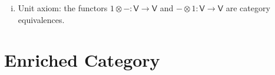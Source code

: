 \documentclass{report}
\begin{document}
{\begin{enumerate}[(i)]
\[\begin{tikzcd}[ampersand replacement=\&, column sep=small]
(A\otimes( B\otimes C))\otimes D \arrow[rd, "{a_{(A,B\otimes C,D)}}"'] \&                                                                                    \&    \&       \& (A\otimes B)\otimes (C\otimes D) \arrow[ld, "{a_{(A, B, C\otimes D)}}"] \\[+35pt]
            \& A\otimes( (B\otimes C)\otimes D) \arrow[rr, "{\mathrm{id}_A\otimes a_{(B,C,D)}}"'] \&    \& A\otimes( B\otimes (C\otimes D)) \&                                                                        
\end{tikzcd}
    \]
    \item Unit axiom: the functors $1\otimes -:\mathsf{V}\to\mathsf{V}$ and $-\otimes 1:\mathsf{V}\to\mathsf{V}$ are category equivalences.
    \end{enumerate}
}
\section{Enriched Category}
\end{document}

